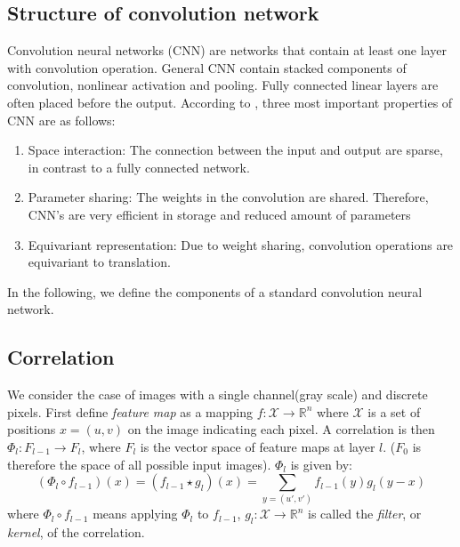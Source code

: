 \documentclass{IEEEtran}
\begin{document}
\subsection*{Structure of convolution network}
Convolution neural networks (CNN) are networks that contain at least one layer with convolution operation. 
General CNN contain stacked components of convolution, nonlinear activation and pooling. 
Fully connected linear layers are often placed before the output.
According to \cite{goodfellow_deep_2016}, 
three most important properties of CNN are as follows:
\begin{enumerate}
    \item Space interaction: The connection between the input and output are sparse, in contrast to a fully connected network.
    \item Parameter sharing: The weights in the convolution are shared. Therefore, CNN's are very efficient in storage and reduced amount of parameters 
    \item Equivariant representation: Due to weight sharing, convolution operations are equivariant to translation.
\end{enumerate}
In the following, we define the components of a standard convolution neural network.

\subsection*{Correlation}
We consider the case of images with a single channel(gray scale) and discrete pixels. 
First define \emph{feature map} as a mapping $f\colon \mathcal{X}\to \mathbb{R}^n$ where $\mathcal{X}$ is a 
set of positions $x = (u,v)$ on the image indicating each pixel.
A correlation is then $\Phi_l\colon F_{l-1} \to F_{l}$, where $F_l$ is the vector space of feature maps at layer $l$. 
($F_0$ is therefore the space of all possible input images).
$\Phi_l$ is given by:
\begin{equation}
    \label{E:convolution}
    (\Phi_l \circ f_{l-1})(x) = (f_{l-1} \star g_l)(x) = \sum_{y = (u',v')} f_{l-1}(y) g_l(y-x)
\end{equation}
where $\Phi_l \circ f_{l-1}$ means applying $\Phi_l$ to $f_{l-1}$, 
$g_l\colon \mathcal{X}\to \mathbb{R}^n$ is called the \emph{filter}, or \emph{kernel}, of the correlation. 

\end{document}
